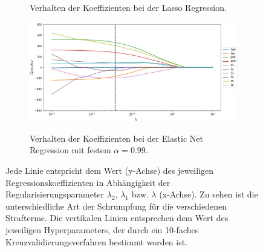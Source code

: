 \begin{figure}
\begin{subfigure}{0.875\textwidth}
	\label{lasso_regression_coefficients}
	\vspace{-0.5cm}
	\caption{Verhalten der Koeffizienten bei der Lasso Regression.}
	\vspace{0.5cm}
	\end{subfigure}
	\begin{subfigure}{0.875\textwidth}
	\centering
	\includegraphics[width = \textwidth]{figures/elastic_net_coefficients_cv.jpg}
	\label{elastic_net_coefficients}
	\vspace{-0.5cm}
	\caption{Verhalten der Koeffizienten bei der Elastic Net Regression mit festem $\alpha = 0.99$.}
	\end{subfigure}
\caption{Jede Linie entspricht dem Wert (y-Achse) des jeweiligen Regressionskoeffizienten in Abhängigkeit der Regularisierungsparameter $\lambda_2$, $\lambda_1$ bzw. $\lambda$ (x-Achse). Zu sehen ist die unterschiedliche Art der Schrumpfung für die verschiedenen Strafterme. Die vertikalen Linien entsprechen dem Wert des jeweiligen Hyperparameters, der durch ein 10-faches Kreuzvalidierungsverfahren bestimmt worden ist.}
\label{regression_coefficients}
\end{figure}